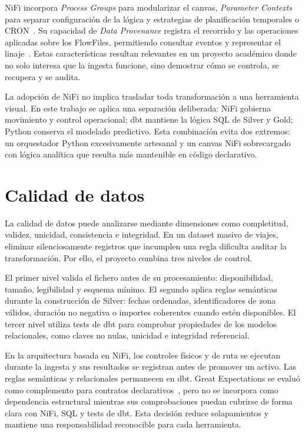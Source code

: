 NiFi incorpora \textit{Process Groups} para modularizar el canvas, \textit{Parameter Contexts} para separar configuración de la lógica y estrategias de planificación temporales o CRON~\cite{nifi_user_guide}. Su capacidad de \textit{Data Provenance} registra el recorrido y las operaciones aplicadas sobre los FlowFiles, permitiendo consultar eventos y representar el linaje~\cite{nifi_user_guide}. Estas características resultan relevantes en un proyecto académico donde no solo interesa que la ingesta funcione, sino demostrar cómo se controla, se recupera y se audita.

La adopción de NiFi no implica trasladar toda transformación a una herramienta visual. En este trabajo se aplica una separación deliberada: NiFi gobierna movimiento y control operacional; dbt mantiene la lógica SQL de Silver y Gold; Python conserva el modelado predictivo. Esta combinación evita dos extremos: un orquestador Python excesivamente artesanal y un canvas NiFi sobrecargado con lógica analítica que resulta más mantenible en código declarativo.

\section{Calidad de datos}

La calidad de datos puede analizarse mediante dimensiones como completitud, validez, unicidad, consistencia e integridad. En un dataset masivo de viajes, eliminar silenciosamente registros que incumplen una regla dificulta auditar la transformación. Por ello, el proyecto combina tres niveles de control.

El primer nivel valida el fichero antes de su procesamiento: disponibilidad, tamaño, legibilidad y esquema mínimo. El segundo aplica reglas semánticas durante la construcción de Silver: fechas ordenadas, identificadores de zona válidos, duración no negativa o importes coherentes cuando estén disponibles. El tercer nivel utiliza tests de dbt para comprobar propiedades de los modelos relacionales, como claves no nulas, unicidad e integridad referencial.

En la arquitectura basada en NiFi, los controles físicos y de ruta se ejecutan durante la ingesta y sus resultados se registran antes de promover un activo. Las reglas semánticas y relacionales permanecen en dbt. Great Expectations se evaluó como complemento para contratos declarativos~\cite{gx_docs}, pero no se incorpora como dependencia estructural mientras sus comprobaciones puedan cubrirse de forma clara con NiFi, SQL y tests de dbt. Esta decisión reduce solapamientos y mantiene una responsabilidad reconocible para cada herramienta.

